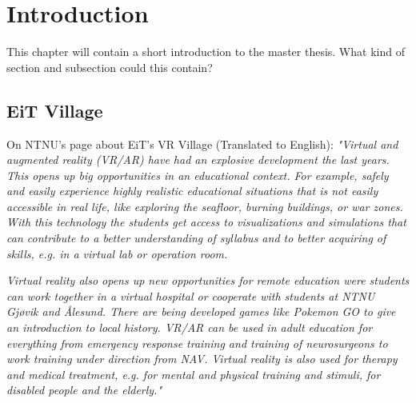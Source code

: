 \chapter{Introduction}
This chapter will contain a short introduction to the master thesis. What kind of section and subsection could this contain?



    
    \section{EiT Village}
    
    On NTNU's page about EiT's VR Village (Translated to English):
    \emph{"Virtual and augmented reality (VR/AR) have had an explosive development the last years. This opens up big opportunities in an educational context. For example, safely and easily experience highly realistic educational situations that is not easily accessible in real life, like exploring the seafloor, burning buildings, or war zones. With this technology the students get access to visualizations and simulations that can contribute to a better understanding of syllabus and to better acquiring of skills, e.g. in a virtual lab or operation room.}
    
    \emph{Virtual reality also opens up new opportunities for remote education were students can work together in a virtual hospital or cooperate with students at NTNU Gjøvik and Ålesund. There are being developed games like Pokemon GO to give an introduction to local history. VR/AR can be used in adult education for everything from emergency response training and training of neurosurgeons to work training under direction from NAV. Virtual reality is also used for therapy and medical treatment, e.g. for mental and physical training and stimuli, for disabled people and the elderly."} \cite{EiTVRLandsby}
    
